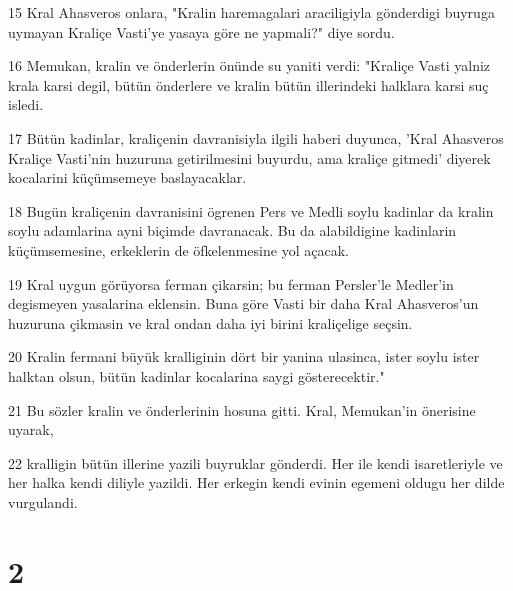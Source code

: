 \par 15 Kral Ahasveros onlara, "Kralin haremagalari araciligiyla gönderdigi buyruga uymayan Kraliçe Vasti'ye yasaya göre ne yapmali?" diye sordu.
\par 16 Memukan, kralin ve önderlerin önünde su yaniti verdi: "Kraliçe Vasti yalniz krala karsi degil, bütün önderlere ve kralin bütün illerindeki halklara karsi suç isledi.
\par 17 Bütün kadinlar, kraliçenin davranisiyla ilgili haberi duyunca, 'Kral Ahasveros Kraliçe Vasti'nin huzuruna getirilmesini buyurdu, ama kraliçe gitmedi' diyerek kocalarini küçümsemeye baslayacaklar.
\par 18 Bugün kraliçenin davranisini ögrenen Pers ve Medli soylu kadinlar da kralin soylu adamlarina ayni biçimde davranacak. Bu da alabildigine kadinlarin küçümsemesine, erkeklerin de öfkelenmesine yol açacak.
\par 19 Kral uygun görüyorsa ferman çikarsin; bu ferman Persler'le Medler'in degismeyen yasalarina eklensin. Buna göre Vasti bir daha Kral Ahasveros'un huzuruna çikmasin ve kral ondan daha iyi birini kraliçelige seçsin.
\par 20 Kralin fermani büyük kralliginin dört bir yanina ulasinca, ister soylu ister halktan olsun, bütün kadinlar kocalarina saygi gösterecektir."
\par 21 Bu sözler kralin ve önderlerinin hosuna gitti. Kral, Memukan'in önerisine uyarak,
\par 22 kralligin bütün illerine yazili buyruklar gönderdi. Her ile kendi isaretleriyle ve her halka kendi diliyle yazildi. Her erkegin kendi evinin egemeni oldugu her dilde vurgulandi.

\chapter{2}

